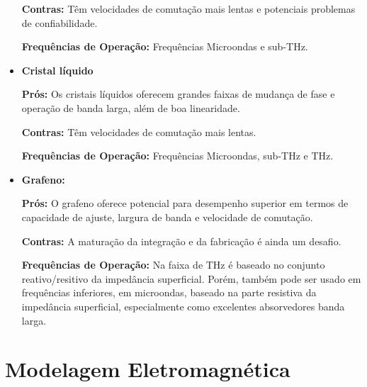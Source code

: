 \documentclass[
	12pt,				%
	openright,			%
	oneside,			%
	a4paper,			%
	english,			%
	brazil				%
	]{abntex2}
\begin{document}
\begin{itemize}
    \textbf{Contras:} Têm velocidades de comutação mais lentas e potenciais problemas de confiabilidade.

    \textbf{Frequências de Operação:} Frequências Microondas e sub-THz.

\item \textbf{Cristal líquido}

    \textbf{}\textbf{Prós:} Os cristais líquidos oferecem grandes faixas de mudança de fase e operação de banda larga, além de boa linearidade. 

    \textbf{Contras:} Têm velocidades de comutação mais lentas.

    \textbf{Frequências de Operação:} Frequências Microondas, sub-THz e THz.

\item \textbf{Grafeno: }

    \textbf{Prós:} O grafeno oferece potencial para desempenho superior em termos de capacidade de ajuste, largura de banda e velocidade de comutação.

    \textbf{Contras:}  A maturação da integração e da fabricação é ainda um  desafio.

    \textbf{Frequências de Operação:} Na faixa de THz é baseado no conjunto reativo/resitivo da impedância superficial. Porém, também pode ser usado em frequências inferiores, em microondas, baseado na parte resistiva da impedância superficial, especialmente como excelentes absorvedores banda larga.

\end{itemize}


\section{Modelagem Eletromagnética}\label{FormulaçãoPWTLBalanis}
\end{document}

